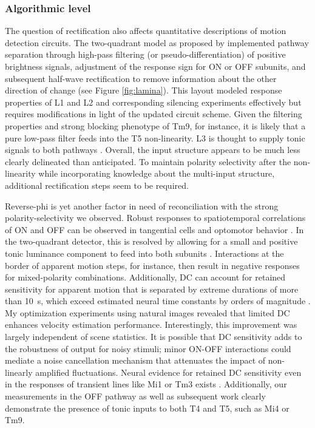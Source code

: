 \subsubsection{Algorithmic level}
The question of rectification also affects quantitative descriptions of motion detection circuits. The two-quadrant model as proposed by \citet{Eichner:2011ic} implemented pathway separation through high-pass filtering (or pseudo-differentiation) of positive brightness signals, adjustment of the response sign for ON or OFF subunits, and subsequent half-wave rectification to remove information about the other direction of change (see Figure \ref{fig:lamina}). This layout modeled response properties of L1 and L2 and corresponding silencing experiments effectively \citep{Laughlin:1978aa,Joesch:2010fw,Joesch:2013ew} but requires modifications in light of the updated circuit scheme. Given the filtering properties and strong blocking phenotype of Tm9, for instance, it is likely that a pure low-pass filter feeds into the T5 non-linearity. L3 is thought to supply tonic signals to both pathways \citep{Silies:2013jp,Takemura:2017aa}. Overall, the input structure appears to be much less clearly delineated than anticipated. To maintain polarity selectivity after the non-linearity while incorporating knowledge about the multi-input structure, additional rectification steps seem to be required.

Reverse-phi is yet another factor in need of reconciliation with the strong polarity-selectivity we observed. Robust responses to spatiotemporal correlations of ON and OFF can be observed in tangential cells \citep{Egelhaaf:1992wh,Eichner:2011ic} and optomotor behavior \citep{Tuthill:2011ic,Clark:2011gw}. In the two-quadrant detector, this is resolved by allowing for a small and positive tonic luminance component to feed into both subunits \citep[see also][]{Kern:2000a}. Interactions at the border of apparent motion steps, for instance, then result in negative responses for mixed-polarity combinations. Additionally, DC can account for retained sensitivity for apparent motion that is separated by extreme durations of more than \SI{10}{\second}, which exceed estimated neural time constants by orders of magnitude \citep{Eichner:2011ic}. My optimization experiments using natural images revealed that limited DC enhances velocity estimation performance. Interestingly, this improvement was largely independent of scene statistics. It is possible that DC sensitivity adds to the robustness of output for noisy stimuli; minor ON-OFF interactions could mediate a noise cancellation mechanism that attenuates the impact of non-linearly amplified fluctuations. Neural evidence for retained DC sensitivity even in the responses of transient lines like Mi1 or Tm3 exists \citep{Behnia:2014jh}. Additionally, our measurements in the OFF pathway as well as subsequent work clearly demonstrate the presence of tonic inputs to both T4 and T5, such as Mi4 or Tm9.

